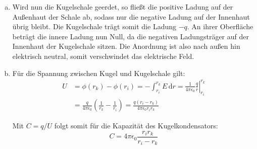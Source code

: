 \begin{enumerate}[(a)]
\item Wird nun die Kugelschale geerdet, so fließt die positive Ladung auf der Außenhaut der Schale ab, sodass nur die negative Ladung auf der Innenhaut übrig bleibt. Die Kugelschale trägt somit die Ladung $-q$. An ihrer Oberfläche beträgt die innere Ladung nun Null, da die negativen Ladungsträger auf der Innenhaut der Kugelschale sitzen. Die Anordnung ist also nach außen hin elektrisch neutral, somit verschwindet das elektrische Feld.

\item Für die Spannung zwischen Kugel und Kugelschale gilt:
\begin{align}
U &= \phi(r_k) - \phi(r_i) = -\int_{r_i}^{r_k}{E\,\mathrm{d}r} = \left. \frac{1}{4\pi\epsilon_0} \frac{q}{r}\right|_{r_i}^{r_k}\\
 &= \frac{q}{4\pi\epsilon_0} \left(\frac{1}{r_k} - \frac{1}{r_i} \right) = \frac{q(r_i-r_k)}{4\pi\epsilon_0r_i r_k}
\end{align}

Mit $C=q/U$ folgt somit für die Kapazität des Kugelkondensators:
\begin{equation}
C=4 \pi \epsilon_0 \frac{r_i r_k}{r_i - r_k}
\end{equation}


\end{enumerate}